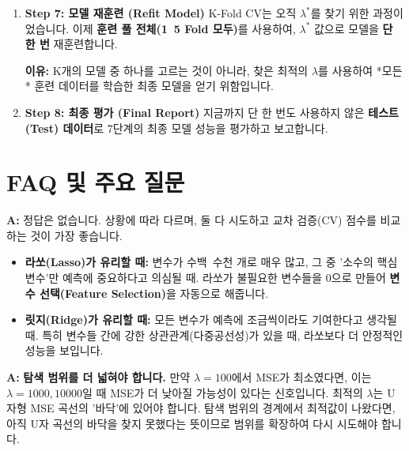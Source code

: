 \documentclass[11pt,a4paper]{book}
\theoremstyle{definition}
\begin{document}
\begin{enumerate}
    \item \textbf{Step 7: 모델 재훈련 (Refit Model)}
    K-Fold CV는 오직 $\lambda^*$를 찾기 위한 과정이었습니다.
    이제 \textbf{훈련 풀 전체(1~5 Fold 모두)}를 사용하여, $\lambda^*$ 값으로 모델을 \textbf{단 한 번} 재훈련합니다.
    
    \textbf{이유:} K개의 모델 중 하나를 고르는 것이 아니라, 찾은 최적의 $\lambda$를 사용하여 *모든* 훈련 데이터를 학습한 최종 모델을 얻기 위함입니다.

    \item \textbf{Step 8: 최종 평가 (Final Report)}
    지금까지 단 한 번도 사용하지 않은 \textbf{테스트(Test) 데이터}로 7단계의 최종 모델 성능을 평가하고 보고합니다.
\end{enumerate}


\section{FAQ 및 주요 질문}

\begin{tcolorbox}[title={Q: 릿지(Ridge)와 라쏘(Lasso) 중 무엇을 써야 하나요?}]
\textbf{A:} 정답은 없습니다. 상황에 따라 다르며, 둘 다 시도하고 교차 검증(CV) 점수를 비교하는 것이 가장 좋습니다.

\begin{itemize}
    \item \textbf{라쏘(Lasso)가 유리할 때:} 
        변수가 수백~수천 개로 매우 많고, 그 중 '소수의 핵심 변수'만 예측에 중요하다고 의심될 때. 라쏘가 불필요한 변수들을 0으로 만들어 \textbf{변수 선택(Feature Selection)}을 자동으로 해줍니다.
    \item \textbf{릿지(Ridge)가 유리할 때:} 
        모든 변수가 예측에 조금씩이라도 기여한다고 생각될 때. 특히 변수들 간에 강한 상관관계(다중공선성)가 있을 때, 라쏘보다 더 안정적인 성능을 보입니다.
\end{itemize}
\end{tcolorbox}

\begin{tcolorbox}[title={Q: $\lambda$ 탐색 범위를 정했는데, 최적값이 범위의 경계(예: 0.001 또는 100)에서 나왔습니다.}]
\textbf{A:} \textbf{탐색 범위를 더 넓혀야 합니다.}
만약 $\lambda=100$에서 MSE가 최소였다면, 이는 $\lambda=1000, 10000$일 때 MSE가 더 낮아질 가능성이 있다는 신호입니다.
최적의 $\lambda$는 U자형 MSE 곡선의 '바닥'에 있어야 합니다. 탐색 범위의 경계에서 최적값이 나왔다면, 아직 U자 곡선의 바닥을 찾지 못했다는 뜻이므로 범위를 확장하여 다시 시도해야 합니다.
\end{tcolorbox}
\end{document}
